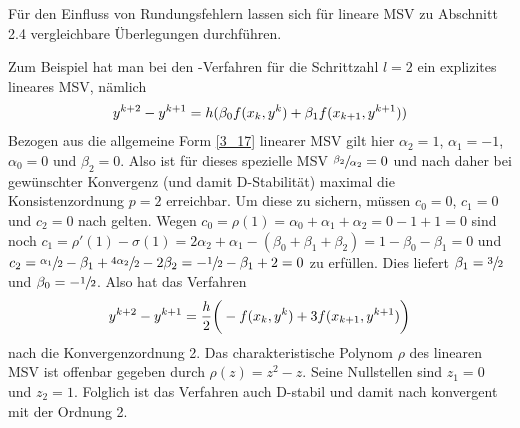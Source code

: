 Für den Einfluss von Rundungsfehlern lassen sich für lineare MSV zu Abschnitt 2.4 vergleichbare Überlegungen durchführen.

Zum Beispiel hat man bei den -Verfahren für die Schrittzahl $l=2$ ein explizites lineares MSV, nämlich 
\begin{align}
	y^{k+2} - y^{k+1} = h(\beta_0 f(x_k,y^k) + \beta_1 f(x_{k+1},y^{k+1})) \notag
\end{align}
Bezogen aus die allgemeine Form \cref{3_17} linearer MSV gilt hier $\alpha_2=1$, $\alpha_1=-1$, $\alpha_0=0$ und $\beta_2=0$. Also ist für dieses spezielle MSV $\sfrac{\beta_2}{\alpha_2}=0$ und nach  daher bei gewünschter Konvergenz (und damit D-Stabilität) maximal die Konsistenzordnung $p=2$ erreichbar. Um diese zu sichern, müssen $c_0=0$, $c_1=0$ und $c_2=0$ nach  gelten. Wegen $c_0=\rho(1)=\alpha_0 + \alpha_1 + \alpha_2 = 0-1+1=0$ sind noch $c_1=\rho'(1)-\sigma(1)=2\alpha_2 + \alpha_1 - (\beta_0 + \beta_1 + \beta_2) = 1-\beta_0 - \beta_1 = 0$ und $c_2=\sfrac{\alpha_1}{2} - \beta_1 + \sfrac{4\alpha_2}{2} - 2\beta_2 = -\sfrac{1}{2} - \beta_1 + 2 = 0$ zu erfüllen. Dies liefert $\beta_1 = \sfrac{3}{2}$ und $\beta_0=-\sfrac{1}{2}$. Also hat das Verfahren
\begin{align}
	y^{k+2} - y^{k+1} = \frac{h}{2}\bigg(-f(x_k,y^k) + 3f(x_{k+1},y^{k+1})\bigg)\notag
\end{align}
nach  die Konvergenzordnung 2. Das charakteristische Polynom $\rho$ des linearen MSV ist offenbar gegeben durch $\rho(z)=z^2-z$. Seine Nullstellen sind $z_1=0$ und $z_2=1$. Folglich ist das Verfahren auch D-stabil und damit nach  konvergent mit der Ordnung 2.